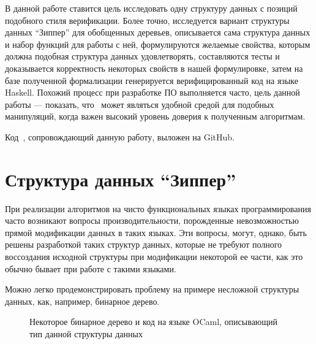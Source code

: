 В данной работе ставится цель исследовать одну структуру данных с позиций подобного стиля верификации. Более точно, исследуется вариант структуры данных ``Зиппер'' для обобщенных деревьев, описывается сама структура данных и набор функций для работы с ней, формулируются желаемые свойства, которым должна подобная структура данных удовлетворять, составляются тесты и доказывается корректность некоторых свойств в нашей формулировке, затем на базе полученной формализации генерируется верифицированный код на языке Haskell. Похожий процесс при разработке ПО выполняется часто, цель данной работы --- показать, что \tcoq~может являться удобной средой для подобных манипуляций, когда важен высокий уровень доверия к полученным алгоритмам.

Код~\autocite{TheCode}, сопровождающий данную работу, выложен на GitHub.

\newpage

\section{Структура данных ``Зиппер''}

При реализации алгоритмов на чисто функциональных языках программирования часто возникают вопросы производительности, порожденные невозможностью прямой модификации данных в таких языках. Эти вопросы, могут, однако, быть решены разработкой таких структур данных, которые не требуют полного воссоздания исходной структуры при модификации некоторой ее части, как это обычно бывает при работе с такими языками.

Можно легко продемонстрировать проблему на примере несложной структуры данных, как, например, бинарное дерево. 

\begin{figure}[H]
\centering


\caption{Некоторое бинарное дерево и код на языке OCaml, описывающий тип данной структуры данных}
\end{figure}


